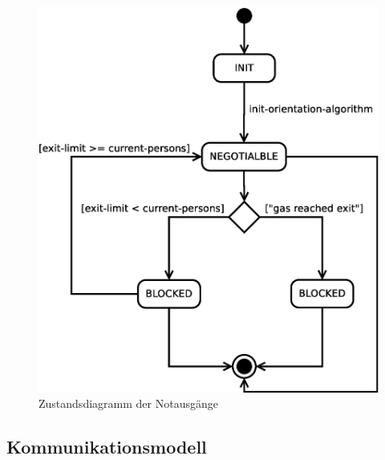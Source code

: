 \begin{figure}[!ht]
\centering
\includegraphics[height=0.6\textwidth]{simulationsumgebung/exit.eps}
\caption{Zustandsdiagramm der Notausgänge}
\label{fig:exit}
\end{figure}

%
%
%
%
%
%
%
%

\subsection{Kommunikationsmodell}
\label{sec:notausgaenge_kommunikation}

